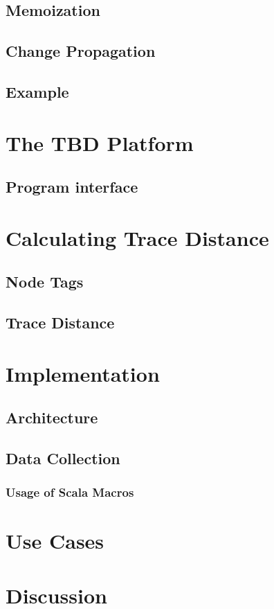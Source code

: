 \section{Memoization}

\section{Change Propagation}

\section{Example}

\chapter{The TBD Platform}
\label{ch:tbd_platform}

\section{Program interface}

\chapter{Calculating Trace Distance}
\label{ch:implementation}

\section{Node Tags}

\section{Trace Distance}

\chapter{Implementation}
\label{ch:impl}

\section{Architecture}

\section{Data Collection}

\subsection{Usage of Scala Macros}

\chapter{Use Cases}
\label{ch:use_cases}

\chapter{Discussion}
\label{ch:discussion}